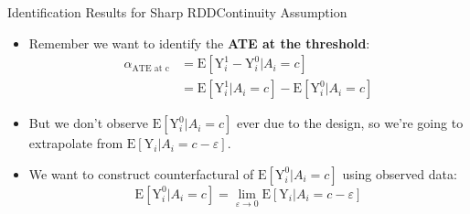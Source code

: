 \documentclass[hyperref={pdfpagelabels=false}]{beamer}
\begin{document}
\begin{frame}{Identification Results for Sharp RDD}{Continuity Assumption}
	\begin{itemize}
		\item Remember we want to identify the \textbf{ATE at the threshold}:
		\begin{equation*}
		\begin{aligned}
		\alpha_{\text{ATE at c}} &=\mathrm{E}[\mathrm{Y}^{1}_{i}-\mathrm{Y}^{0}_{i}|A_i=c] \\
		&= \mathrm{E}[\mathrm{Y}^{1}_{i} |A_i=c] -\mathrm{E}[\mathrm{Y}^{0}_{i} |A_i=c]
		\end{aligned}
		\end{equation*}
		\item But we don't observe $\mathrm{E}[\mathrm{Y}^{0}_{i} |A_i=c]$ ever due to the design, so we're going to extrapolate from $\mathrm{E}[\mathrm{Y}_{i} |A_i=c-\varepsilon]$.
		\vspace{0.2cm}
		\item We want to construct counterfactural of $\mathrm{E}[\mathrm{Y}^{0}_{i}|A_i=c]$ using observed data: 
		\begin{equation*}
		\mathrm{E}[\mathrm{Y}^{0}_{i}|A_i=c]  = \lim_{\varepsilon\rightarrow 0}\mathrm{E}[\mathrm{Y}_{i}|A_i=c-\varepsilon]
		\end{equation*}
		
	\end{itemize}
\end{frame}
\end{document}
